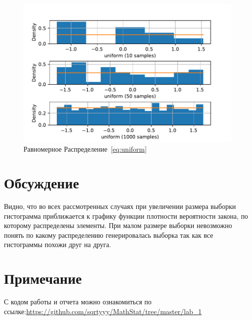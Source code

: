\documentclass[a4paper]{article}
\begin{document}
        \begin{figure}[H]
            \centering
            \includegraphics[width = 16 cm]{src/uniform}
            \caption{Равномерное Распределение~\eqref{eq:uniform}}
            \label{fig:uniform}
        \end{figure}

    \section{Обсуждение}
        Видно, что во всех рассмотренных случаях при увеличении размера выборки гистограмма приближается к графику функции плотности вероятности закона, по которому распределены элементы.
        При малом размере выборки невозможно понять по какому распределению генерировалась выборка так как все гистограммы похожи друг на друга.
    \section*{Примечание}
        С кодом работы и отчета можно ознакомиться по ссылке:\;\url{https://github.com/sqrtyyy/MathStat/tree/master/lab_1}
\end{document}

